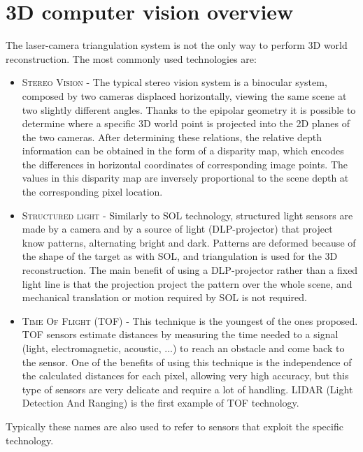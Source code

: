 \section{3D computer vision overview}
The laser-camera triangulation system is not the only way to perform 3D world reconstruction. The most commonly used technologies are:
\begin{itemize}
  \item \textsc{Stereo Vision} - The typical stereo vision system is a binocular system, composed by two cameras displaced horizontally, viewing the same scene at two slightly different angles. Thanks to the epipolar geometry it is possible to determine where a specific 3D world point is projected into the 2D planes of the two cameras. After determining these relations, the relative depth information can be obtained in the form of a disparity map, which encodes the differences in horizontal coordinates of corresponding image points. The values in this disparity map are inversely proportional to the scene depth at the corresponding pixel location.
  
  \item \textsc{Structured light} - Similarly to \acs{SOL} technology, structured light sensors are made by a camera and by a source of light (DLP-projector) that project know patterns, alternating bright and dark. Patterns are deformed because of the shape of the target as with \acs{SOL}, and triangulation is used for the 3D reconstruction. The main benefit of using a DLP-projector rather than a fixed light line is that the projection project the pattern over the whole scene, and mechanical translation or motion required by SOL is not required.

  \item \textsc{Time Of Flight (\acs{TOF})} - This technique is the youngest of the ones proposed. \acs{TOF} sensors estimate distances by measuring the time needed to a signal (light, electromagnetic, acoustic, ...) to reach an obstacle and come back to the sensor. One of the benefits of using this technique is the independence of the calculated distances for each pixel, allowing very high accuracy, but this type of sensors are very delicate and require a lot of handling. \acs{LIDAR} (Light Detection And Ranging) is the first example of \acs{TOF} technology.
  
\end{itemize}
Typically these names are also used to refer to sensors that exploit the specific technology.